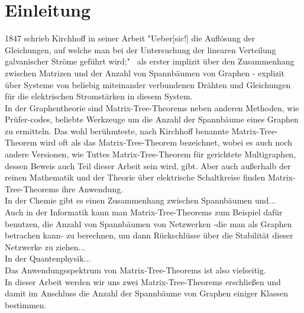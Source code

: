 \section{Einleitung}
1847 schrieb Kirchhoff in seiner Arbeit "Ueber[sic!] die Auflösung der Gleichungen, auf welche man bei der Untersuchung der linearen Verteilung galvanischer Ströme geführt wird;"~\cite{kirchhoff_1847} als erster implizit über den Zusammenhang zwischen Matrizen und der Anzahl von Spannbäumen von Graphen - explizit über Systeme von beliebig miteinander verbundenen Drähten und Gleichungen für die elektrischen Stromstärken in diesem System.\\
In der Graphentheorie sind Matrix-Tree-Theorems neben anderen Methoden, wie Prüfer-codes, beliebte Werkzeuge um die Anzahl der Spannbäume eines Graphen zu ermitteln.
Das wohl berühmteste, nach Kirchhoff benannte Matrix-Tree-Theorem wird oft als das Matrix-Tree-Theorem bezeichnet, wobei es auch noch andere Versionen, wie Tuttes Matrix-Tree-Theorem für gerichtete Multigraphen, dessen Beweis auch Teil dieser Arbeit sein wird, gibt.
Aber auch außerhalb der reinen Mathematik und der Theorie über elektrische Schaltkreise finden Matrix-Tree-Theorems ihre Anwendung.\\
In der Chemie gibt es einen Zusammenhang zwischen Spannbäumen und...~\cite{hinchliffe_2007}\\
Auch in der Informatik kann man Matrix-Tree-Theorems zum Beispiel dafür benutzen, die Anzahl von Spannbäumen von Netzwerken -die man als Graphen betrachen kann- zu berechnen, um dann Rückschlüsse über die Stabilität dieser Netzwerke zu ziehen...~\cite{yakoubi_2019}\\
In der Quantenphysik...~\cite{giovannetti_severini_2013}\\
Das Anwendungsspektrum von Matrix-Tree-Theorems ist also vielseitig.\\
In dieser Arbeit werden wir uns zwei Matrix-Tree-Theorems erschließen und damit im Anschluss die Anzahl der Spannbäume von Graphen einiger Klassen bestimmen.
